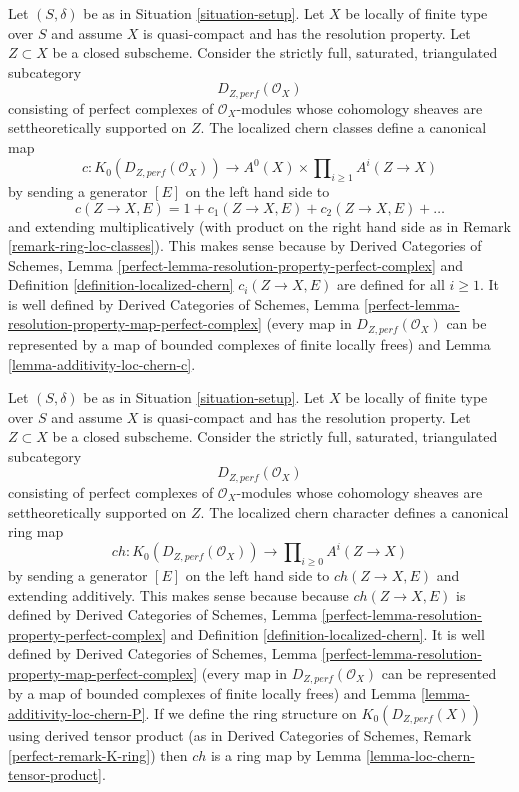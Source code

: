 \begin{remark}
\label{remark-localized-chern-classes-K}
Let $(S, \delta)$ be as in Situation \ref{situation-setup}.
Let $X$ be locally of finite type over $S$ and assume $X$
is quasi-compact and has the resolution property.
Let $Z \subset X$ be a closed subscheme. Consider the strictly
full, saturated, triangulated subcategory
$$
D_{Z, perf}(\mathcal{O}_X)
$$
consisting of perfect complexes of $\mathcal{O}_X$-modules
whose cohomology sheaves are settheoretically supported on $Z$.
The localized chern classes define a canonical map
$$
c : K_0(D_{Z, perf}(\mathcal{O}_X)) \longrightarrow
A^0(X) \times \prod\nolimits_{i \geq 1} A^i(Z \to X)
$$
by sending a generator $[E]$ on the left hand side to
$$
c(Z \to X, E) = 1 + c_1(Z \to X, E) + c_2(Z \to X, E) + \ldots
$$
and extending multiplicatively (with product on the right hand
side as in Remark \ref{remark-ring-loc-classes}). This makes sense because by
Derived Categories of Schemes, Lemma
\ref{perfect-lemma-resolution-property-perfect-complex}
and Definition \ref{definition-localized-chern}
$c_i(Z \to X, E) $ are defined for all $i \geq 1$.
It is well defined by Derived Categories of Schemes, Lemma
\ref{perfect-lemma-resolution-property-map-perfect-complex}
(every map in $D_{Z, perf}(\mathcal{O}_X)$ can be represented
by a map of bounded complexes of finite locally frees) and
Lemma \ref{lemma-additivity-loc-chern-c}.
\end{remark}

\begin{remark}
\label{remark-localized-chern-character-K}
Let $(S, \delta)$ be as in Situation \ref{situation-setup}.
Let $X$ be locally of finite type over $S$ and assume $X$
is quasi-compact and has the resolution property.
Let $Z \subset X$ be a closed subscheme. Consider the strictly
full, saturated, triangulated subcategory
$$
D_{Z, perf}(\mathcal{O}_X)
$$
consisting of perfect complexes of $\mathcal{O}_X$-modules
whose cohomology sheaves are settheoretically supported on $Z$.
The localized chern character defines a canonical ring map
$$
ch : K_0(D_{Z, perf}(\mathcal{O}_X)) \longrightarrow
\prod\nolimits_{i \geq 0} A^i(Z \to X)
$$
by sending a generator $[E]$ on the left hand side to
$ch(Z \to X, E)$ and extending additively. This makes sense because because
$ch(Z \to X, E)$ is defined by
Derived Categories of Schemes, Lemma
\ref{perfect-lemma-resolution-property-perfect-complex}
and Definition \ref{definition-localized-chern}.
It is well defined by Derived Categories of Schemes, Lemma
\ref{perfect-lemma-resolution-property-map-perfect-complex}
(every map in $D_{Z, perf}(\mathcal{O}_X)$ can be represented
by a map of bounded complexes of finite locally frees) and
Lemma \ref{lemma-additivity-loc-chern-P}.
If we define the ring structure on $K_0(D_{Z, perf}(X))$ using
derived tensor product (as in
Derived Categories of Schemes, Remark \ref{perfect-remark-K-ring})
then $ch$ is a ring map by Lemma \ref{lemma-loc-chern-tensor-product}.
\end{remark}

